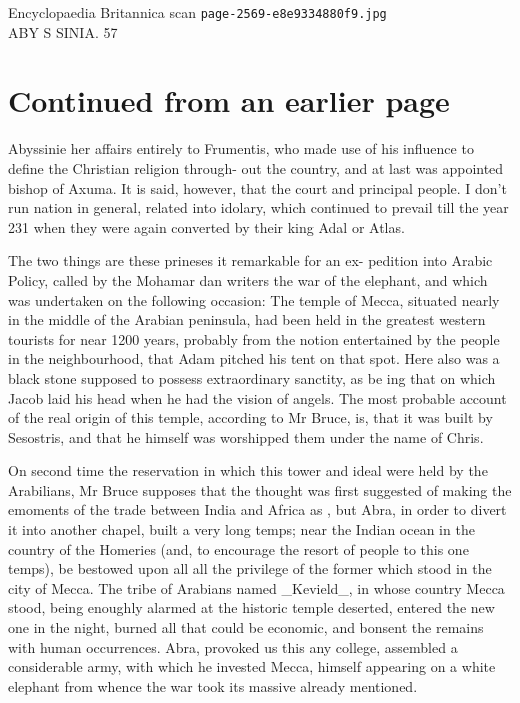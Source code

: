 \documentclass{article}
\begin{document}
\begin{center}
{\Large Encyclopaedia Britannica scan \texttt{page-2569-e8e9334880f9.jpg}}\\[0.5em]
ABY S SINIA. 57
\end{center}
\section*{Continued from an earlier page}
Abyssinie her affairs entirely to Frumentis, who made use of his influence to define the Christian religion through- out the country, and at last was appointed bishop of Axuma. It is said, however, that the court and principal people. I don’t run nation in general, related into idolary, which continued to prevail till the year 231 when they were again converted by their king Adal or Atlas.

The two things are these prineses it remarkable for an ex- pedition into Arabic Policy, called by the Mohamar dan writers the war of the elephant, and which was undertaken on the following occasion: The temple of Mecca, situated nearly in the middle of the Arabian peninsula, had been held in the greatest western tourists for near 1200 years, probably from the notion entertained by the people in the neighbourhood, that Adam pitched his tent on that spot. Here also was a black stone supposed to possess extraordinary sanctity, as be ing that on which Jacob laid his head when he had the vision of angels. The most probable account of the real origin of this temple, according to Mr Bruce, is, that it was built by Sesostris, and that he himself was worshipped them under the name of Chris.

On second time the reservation in which this tower and ideal were held by the Arabilians, Mr Bruce supposes that the thought was first suggested of making the emoments of the trade between India and Africa as , but Abra, in order to divert it into another chapel, built a very long temps; near the Indian ocean in the country of the Homeries (and, to encourage the resort of people to this one temps), be bestowed upon all all the privilege of the former which stood in the city of Mecca. The tribe of Arabians named \_Kevield\_, in whose country Mecca stood, being enoughly alarmed at the historic temple deserted, entered the new one in the night, burned all that could be economic, and bonsent the remains with human occurrences. Abra, provoked us this any college, assembled a considerable army, with which he invested Mecca, himself appearing on a white elephant from whence the war took its massive already mentioned.
\end{document}
